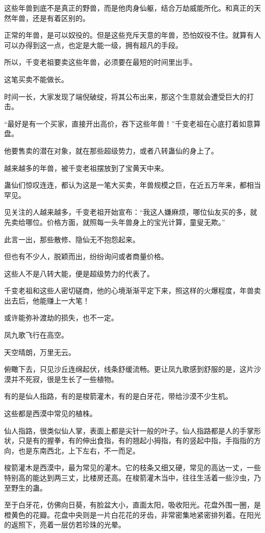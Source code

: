 \begin{this_body}
这些年兽到底不是真正的野兽，而是他肉身仙躯，结合万劫威能所化。和真正的天然年兽，还是有着区别的。

正常的年兽，是可以奴役的。但是这些充斥天意的年兽，恐怕奴役不住。就算有人可以办得到这一点，也定是大能一级，拥有超凡的手段。

所以，千变老祖要卖这些年兽，必须要在最短的时间里出手。

这笔买卖不能做长。

时间一长，大家发现了端倪破绽，将其公布出来，那这个生意就会遭受巨大的打击。

“最好是有一个买家，直接开出高价，吞下这些年兽！”千变老祖在心底打着如意算盘。

他要售卖的潜在对象，就在那些超级势力，或者八转蛊仙的身上了。

越来越多的年兽，被千变老祖摆放到了宝黄天中来。

蛊仙们惊叹连连，都认为这是一笔大买卖，年兽规模之巨，在近五万年来，都相当罕见。

见关注的人越来越多，千变老祖开始宣布：“我这人嫌麻烦，哪位仙友买的多，就先卖给哪位。价格方面，就照每一头年兽身上的宝光计算，童叟无欺。”

此言一出，那些散修、隐仙无不抱怨起来。

但也有不少人，脱颖而出，纷纷询问或者商量价格。

这些人不是八转大能，便是超级势力的代表了。

千变老祖和这些人密切磋商，他的心境渐渐平定下来，照这样的火爆程度，年兽卖出去后，他能赚上一大笔！

或许能弥补渡劫的损失，也不一定。

凤九歌飞行在高空。

天空晴朗，万里无云。

俯瞰下去，只见沙丘连绵起伏，线条舒缓流畅。更让凤九歌感到舒服的是，这片沙漠并不死寂，很是生长了一些植物。

有的是仙人指路，有的是梭箭灌木，有的是白牙花，带给沙漠不少生机。

这些都是西漠中常见的植株。

仙人指路，很类似仙人掌，表面上都是尖针一般的叶子。仙人指路都是人的手掌形状，只是有的握拳，有的伸出食指，有的翘起小拇指，有的竖起中指，手指指的方向，也是东南西北，上下左右，不一而足。

梭箭灌木是西漠中，最为常见的灌木。它的枝条又细又硬，常见的高达一丈，一些特别高的能达到两三丈，比楼房还高。在梭箭灌木当中，往往生活着一些沙虫，乃至野生的蛊。

至于白牙花，仿佛向日葵，有脸盆大小，直面太阳，吸收阳光。花盘外围一圈，是橙黄色的花瓣。花盘中央则是一片白花花的牙齿，非常密集地紧密排列着。在阳光的返照下，亮着一层仿若珍珠的光晕。


\end{this_body}
